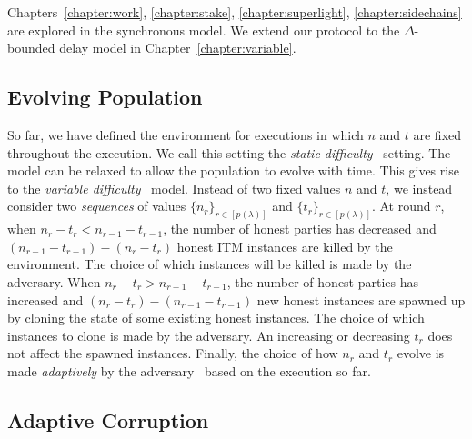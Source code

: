 Chapters~\ref{chapter:work},
\ref{chapter:stake}, \ref{chapter:superlight}, \ref{chapter:sidechains} are
explored in the synchronous model. We extend our protocol to the $\Delta$-bounded
delay model in Chapter~\ref{chapter:variable}.

\subsection{Evolving Population}
So far, we have defined the environment for executions in which $n$ and $t$ are
fixed throughout the execution. We call this setting the
\emph{static difficulty}~\cite{backbone,backbone-new}
setting. The model can be relaxed to allow the population to evolve with time.
This gives rise to the
\emph{variable difficulty}~\cite{varbackbone}
model.
Instead of two fixed values $n$ and $t$, we instead consider two
\emph{sequences} of values
$\{n_r\}_{r \in [p(\lambda)]}$ and $\{t_r\}_{r \in [p(\lambda)]}$.
At round $r$, when $n_r - t_r < n_{r-1} - t_{r-1}$, the number of honest
parties has decreased and $(n_{r-1} - t_{r-1}) - (n_r - t_r)$ honest ITM
instances are killed by the environment. The choice of which instances will be
killed is made by the adversary. When
$n_r - t_r > n_{r-1} - t_{r-1}$, the number of honest parties has increased and
$(n_r - t_r) - (n_{r-1} - t_{r-1})$ new honest instances are spawned up by
cloning the state of some existing honest instances. The choice of which
instances to clone is made by the adversary. An increasing or decreasing $t_r$
does not affect the spawned instances. Finally, the choice of how $n_r$
and $t_r$ evolve is made \emph{adaptively} by the adversary~\cite{varbackbone-new}
based on the execution so far.



\subsection{Adaptive Corruption}
\label{sec:prelim-corr}


